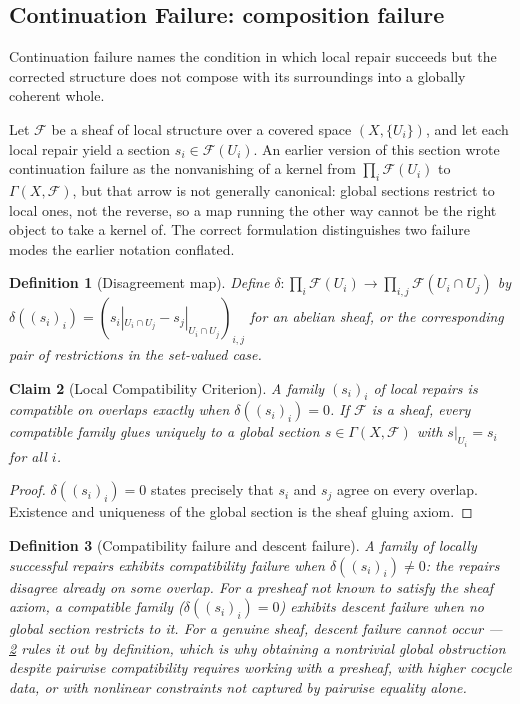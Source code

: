 \documentclass[12pt]{report}
\newtheorem{definition}{Definition}[section]
\newtheorem{claim}[definition]{Claim}
\begin{document}
\subsection{Continuation Failure: composition failure}
\label{subsec:continuation-failure}

Continuation failure names the condition in which local repair succeeds
but the corrected structure does not compose with its surroundings into a
globally coherent whole.

Let $\mathcal{F}$ be a sheaf of local structure over a covered space
$(X, \{U_i\})$, and let each local repair yield a section $s_i \in
\mathcal{F}(U_i)$. An earlier version of this section wrote continuation
failure as the nonvanishing of a kernel from $\prod_i \mathcal{F}(U_i)$ to
$\Gamma(X,\mathcal{F})$, but that arrow is not generally canonical: global
sections restrict to local ones, not the reverse, so a map running the
other way cannot be the right object to take a kernel of. The correct
formulation distinguishes two failure modes the earlier notation
conflated.

\begin{definition}[Disagreement map]
\label{def:disagreement}
Define $\delta : \prod_i \mathcal{F}(U_i) \to \prod_{i,j} \mathcal{F}(U_i
\cap U_j)$ by $\delta((s_i)_i) = (s_i|_{U_i \cap U_j} - s_j|_{U_i \cap
U_j})_{i,j}$ for an abelian sheaf, or the corresponding pair of
restrictions in the set-valued case.
\end{definition}

\begin{claim}[Local Compatibility Criterion]
\label{thm:local-compatibility}
A family $(s_i)_i$ of local repairs is compatible on overlaps exactly
when $\delta((s_i)_i) = 0$. If $\mathcal{F}$ is a sheaf, every compatible
family glues uniquely to a global section $s \in \Gamma(X,\mathcal{F})$
with $s|_{U_i} = s_i$ for all $i$.
\end{claim}

\begin{proof}
$\delta((s_i)_i) = 0$ states precisely that $s_i$ and $s_j$ agree on
every overlap. Existence and uniqueness of the global section is the
sheaf gluing axiom.
\end{proof}

\begin{definition}[Compatibility failure and descent failure]
\label{def:two-failures}
A family of locally successful repairs exhibits \emph{compatibility
failure} when $\delta((s_i)_i) \neq 0$: the repairs disagree already on
some overlap. For a presheaf not known to satisfy the sheaf axiom, a
compatible family ($\delta((s_i)_i) = 0$) exhibits \emph{descent failure}
when no global section restricts to it. For a genuine sheaf, descent
failure cannot occur --- \cref{thm:local-compatibility} rules it out by
definition, which is why obtaining a nontrivial global obstruction
despite pairwise compatibility requires working with a presheaf, with
higher cocycle data, or with nonlinear constraints not captured by
pairwise equality alone.
\end{definition}
\end{document}
